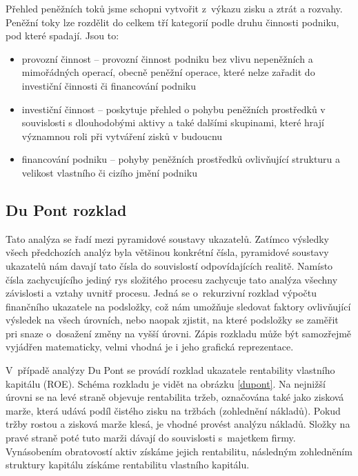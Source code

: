 Přehled peněžních toků jsme schopni vytvořit z~výkazu zisku a ztrát a rozvahy. Peněžní toky lze rozdělit do celkem tří kategorií podle druhu činnosti podniku, pod které spadají. Jsou to:

\begin{itemize}
  \item provozní činnost -- provozní činnost podniku bez vlivu nepeněžních a mimořádných operací, obecně peněžní operace, které nelze zařadit do investiční činnosti či financování podniku
  \item investiční činnost -- poskytuje přehled o pohybu peněžních prostředků v souvislosti s dlouhodobými aktivy a také dalšími skupinami, které hrají významnou roli při vytváření zisků v budoucnu
  \item financování podniku -- pohyby peněžních prostředků ovlivňující strukturu a velikost vlastního či cizího jmění podniku
\end{itemize}



\subsection{Du Pont rozklad}
Tato analýza se řadí mezi pyramidové soustavy ukazatelů. Zatímco výsledky všech předchozích analýz byla většinou konkrétní čísla, pyramidové soustavy ukazatelů nám davají tato čísla do souvislostí odpovídajících realitě. Namísto čísla zachycujícího jediný rys složitého procesu zachycuje tato analýza všechny závislosti a vztahy uvnitř procesu. Jedná se o~rekurzivní rozklad výpočtu finančního ukazatele na podsložky, což nám umožňuje sledovat faktory ovlivňující výsledek na všech úrovních, nebo naopak zjistit, na které podsložky se zaměřit pri snaze o~dosažení změny na vyšší úrovni. Zápis rozkladu může být samozřejmě vyjádřen matematicky, velmi vhodná je i jeho grafická reprezentace.

V~případě analýzy Du Pont se provádí rozklad ukazatele rentability vlastního kapitálu (ROE). Schéma rozkladu je vidět na obrázku \ref{dupont}. Na nejnižší úrovni se na levé straně objevuje rentabilita tržeb, označována také jako zisková marže, která udává podíl čistého zisku na tržbách (zohlednění nákladů). Pokud tržby rostou a zisková marže klesá, je vhodné provést analýzu nákladů. Složky na pravé straně poté tuto marži dávají do souvislosti s~majetkem firmy. Vynásobením obratovostí aktiv získáme jejich rentabilitu, následným zohledněním struktury kapitálu získáme rentabilitu vlastního kapitálu.

